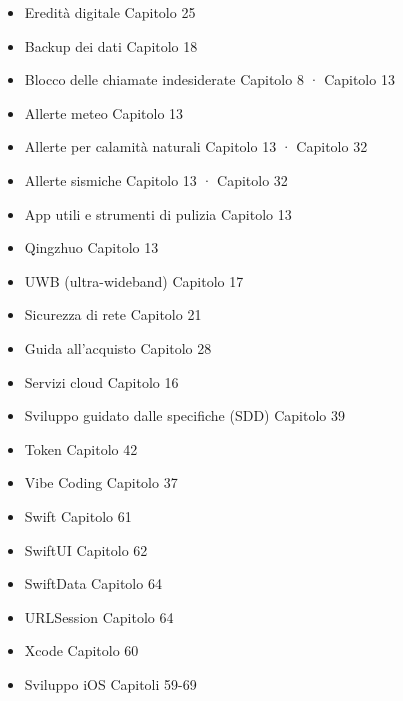 \begin{itemize}
  \item Eredità digitale Capitolo 25
  \item Backup dei dati Capitolo 18
  \item Blocco delle chiamate indesiderate Capitolo 8 · Capitolo 13
  \item Allerte meteo Capitolo 13
  \item Allerte per calamità naturali Capitolo 13 · Capitolo 32
  \item Allerte sismiche Capitolo 13 · Capitolo 32
  \item App utili e strumenti di pulizia Capitolo 13
  \item Qingzhuo Capitolo 13
  \item UWB (ultra-wideband) Capitolo 17
  \item Sicurezza di rete Capitolo 21
  \item Guida all'acquisto Capitolo 28
  \item Servizi cloud Capitolo 16
  \item Sviluppo guidato dalle specifiche (SDD) Capitolo 39
  \item Token Capitolo 42
  \item Vibe Coding Capitolo 37
  \item Swift Capitolo 61
  \item SwiftUI Capitolo 62
  \item SwiftData Capitolo 64
  \item URLSession Capitolo 64
  \item Xcode Capitolo 60
  \item Sviluppo iOS Capitoli 59-69
\end{itemize}


